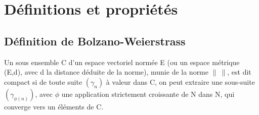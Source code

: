 \section{Définitions et propriétés}
\subsection{Définition de Bolzano-Weierstrass}
\begin{de}
Un sous ensemble C d'un espace vectoriel normée E (ou un espace métrique (E,d), avec d la distance déduite de la norme), munie de la norme $\parallel~\parallel$, est dit compact si de toute suite $(\gamma_n)$ à valeur dans C, on peut extraire une sous-suite $(\gamma_{\phi(n)})$, avec $\phi$ une application strictement croissante de N dans N, qui converge vers un éléments de C.
\end{de}
